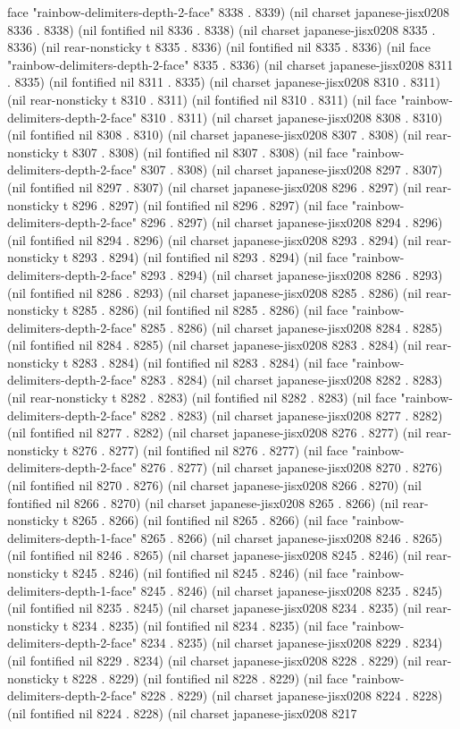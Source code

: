 face "rainbow-delimiters-depth-2-face" 8338 . 8339) (nil charset japanese-jisx0208 8336 . 8338) (nil fontified nil 8336 . 8338) (nil charset japanese-jisx0208 8335 . 8336) (nil rear-nonsticky t 8335 . 8336) (nil fontified nil 8335 . 8336) (nil face "rainbow-delimiters-depth-2-face" 8335 . 8336) (nil charset japanese-jisx0208 8311 . 8335) (nil fontified nil 8311 . 8335) (nil charset japanese-jisx0208 8310 . 8311) (nil rear-nonsticky t 8310 . 8311) (nil fontified nil 8310 . 8311) (nil face "rainbow-delimiters-depth-2-face" 8310 . 8311) (nil charset japanese-jisx0208 8308 . 8310) (nil fontified nil 8308 . 8310) (nil charset japanese-jisx0208 8307 . 8308) (nil rear-nonsticky t 8307 . 8308) (nil fontified nil 8307 . 8308) (nil face "rainbow-delimiters-depth-2-face" 8307 . 8308) (nil charset japanese-jisx0208 8297 . 8307) (nil fontified nil 8297 . 8307) (nil charset japanese-jisx0208 8296 . 8297) (nil rear-nonsticky t 8296 . 8297) (nil fontified nil 8296 . 8297) (nil face "rainbow-delimiters-depth-2-face" 8296 . 8297) (nil charset japanese-jisx0208 8294 . 8296) (nil fontified nil 8294 . 8296) (nil charset japanese-jisx0208 8293 . 8294) (nil rear-nonsticky t 8293 . 8294) (nil fontified nil 8293 . 8294) (nil face "rainbow-delimiters-depth-2-face" 8293 . 8294) (nil charset japanese-jisx0208 8286 . 8293) (nil fontified nil 8286 . 8293) (nil charset japanese-jisx0208 8285 . 8286) (nil rear-nonsticky t 8285 . 8286) (nil fontified nil 8285 . 8286) (nil face "rainbow-delimiters-depth-2-face" 8285 . 8286) (nil charset japanese-jisx0208 8284 . 8285) (nil fontified nil 8284 . 8285) (nil charset japanese-jisx0208 8283 . 8284) (nil rear-nonsticky t 8283 . 8284) (nil fontified nil 8283 . 8284) (nil face "rainbow-delimiters-depth-2-face" 8283 . 8284) (nil charset japanese-jisx0208 8282 . 8283) (nil rear-nonsticky t 8282 . 8283) (nil fontified nil 8282 . 8283) (nil face "rainbow-delimiters-depth-2-face" 8282 . 8283) (nil charset japanese-jisx0208 8277 . 8282) (nil fontified nil 8277 . 8282) (nil charset japanese-jisx0208 8276 . 8277) (nil rear-nonsticky t 8276 . 8277) (nil fontified nil 8276 . 8277) (nil face "rainbow-delimiters-depth-2-face" 8276 . 8277) (nil charset japanese-jisx0208 8270 . 8276) (nil fontified nil 8270 . 8276) (nil charset japanese-jisx0208 8266 . 8270) (nil fontified nil 8266 . 8270) (nil charset japanese-jisx0208 8265 . 8266) (nil rear-nonsticky t 8265 . 8266) (nil fontified nil 8265 . 8266) (nil face "rainbow-delimiters-depth-1-face" 8265 . 8266) (nil charset japanese-jisx0208 8246 . 8265) (nil fontified nil 8246 . 8265) (nil charset japanese-jisx0208 8245 . 8246) (nil rear-nonsticky t 8245 . 8246) (nil fontified nil 8245 . 8246) (nil face "rainbow-delimiters-depth-1-face" 8245 . 8246) (nil charset japanese-jisx0208 8235 . 8245) (nil fontified nil 8235 . 8245) (nil charset japanese-jisx0208 8234 . 8235) (nil rear-nonsticky t 8234 . 8235) (nil fontified nil 8234 . 8235) (nil face "rainbow-delimiters-depth-2-face" 8234 . 8235) (nil charset japanese-jisx0208 8229 . 8234) (nil fontified nil 8229 . 8234) (nil charset japanese-jisx0208 8228 . 8229) (nil rear-nonsticky t 8228 . 8229) (nil fontified nil 8228 . 8229) (nil face "rainbow-delimiters-depth-2-face" 8228 . 8229) (nil charset japanese-jisx0208 8224 . 8228) (nil fontified nil 8224 . 8228) (nil charset japanese-jisx0208 8217 